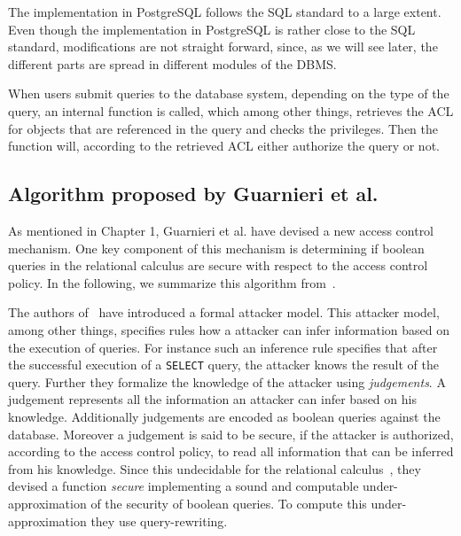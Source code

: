 The implementation in PostgreSQL follows the SQL standard to a large extent. 
%
Even though the implementation in PostgreSQL is rather close to the SQL standard, modifications are not straight forward, since, as we will see later, the different parts are spread in different modules of the DBMS.

When users submit queries to the database system, depending on the type of the query, an internal function is called, which among other things, retrieves the ACL for objects that are referenced in the query and checks the privileges.
%
Then the function will, according to the retrieved ACL either authorize the query or not.

\subsection{Algorithm proposed by Guarnieri et al.}

As mentioned in Chapter 1, Guarnieri et al. have devised a new access control mechanism.
%
One key component of this mechanism is determining if boolean queries in the relational calculus are secure with respect to the access control policy.
%
In the following, we summarize this algorithm from~\cite{guarnieri2016strong}.

The authors of~\cite{guarnieri2016strong} have introduced a formal attacker model.
%
This attacker model, among other things, specifies rules how a attacker can infer information based on the execution of queries.
%
For instance such an inference rule specifies that after the successful execution of a \texttt{SELECT} query, the attacker knows the result of the query.
%
Further they formalize the knowledge of the attacker using \emph{judgements}.
%
A judgement represents all the information an attacker can infer based on his knowledge.
%
Additionally judgements are encoded as boolean queries against the database.
%
Moreover a judgement is said to be secure, if the attacker is authorized, according to the access control policy, to read all information that can be inferred from his knowledge.
%
Since this undecidable for the relational calculus~\cite{guarnieri2014optimal}, they devised a function \emph{secure} implementing a sound and computable under-approximation of the security of boolean queries.
%
To compute this under-approximation they use query-rewriting.

